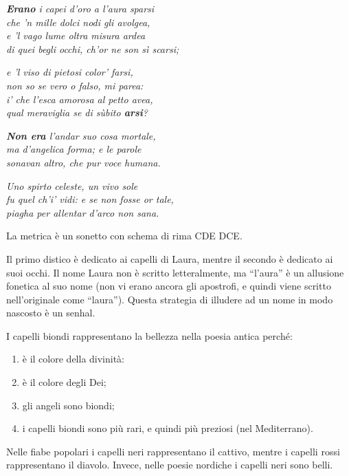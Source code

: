 \documentclass[a4paper]{article}
\newcommand*\circled[1]{\tikz[baseline=(char.base)]{
            \node[shape=circle,draw,inner sep=2pt] (char) {#1};}}
\newcommand{\quotes}[1]{``#1''}
\begin{document}
\begin{center}
    \textit{\textbf{Erano} i capei d'oro a l'aura sparsi} \\
    \textit{che 'n mille dolci nodi gli avolgea,} \\
    \textit{e 'l vago lume oltra misura ardea} \\
    \textit{di quei begli occhi, ch'or ne son sì scarsi;}
\end{center}
\begin{center}
    \textit{e 'l viso di pietosi color' farsi,} \\
    \textit{non so se vero o falso, mi parea:} \\
    \textit{i' che l'esca amorosa al petto avea,} \\
    \textit{qual meraviglia se di sùbito \textbf{arsi}?} 
\end{center}
\begin{center}
    \textit{\textbf{Non era} l'andar suo cosa mortale,} \\
    \textit{ma d'angelica forma; e le parole} \\
    \textit{sonavan altro, che pur voce humana.}
\end{center}
\begin{center}
    \textit{Uno spirto celeste, un vivo sole} \\
    \textit{fu quel ch'i' vidi: e se non fosse or tale,} \\
    \textit{piagha per allentar d'arco non sana.}
\end{center}

La metrica è un sonetto con schema di rima CDE DCE.


\circled{1} Il primo distico è dedicato ai capelli di Laura, mentre il secondo è
dedicato ai suoi occhi. Il nome Laura non è scritto letteralmente,
ma \quotes{l'aura} è un allusione fonetica al suo nome (non vi erano ancora gli apostrofi,
e quindi viene scritto nell'originale come \quotes{laura}).
Questa strategia di illudere ad un nome in modo nascosto è un senhal.


I capelli biondi rappresentano la bellezza nella poesia antica perché:
\begin{enumerate}
    \item è il colore della divinità:
    \item è il colore degli Dei;
    \item gli angeli sono biondi;
    \item i capelli biondi sono più rari, e quindi più preziosi (nel Mediterrano).
\end{enumerate}
Nelle fiabe popolari i capelli neri rappresentano il cattivo,
mentre i capelli rossi rappresentano il diavolo.
Invece, nelle poesie nordiche i capelli neri sono belli.
\end{document}
